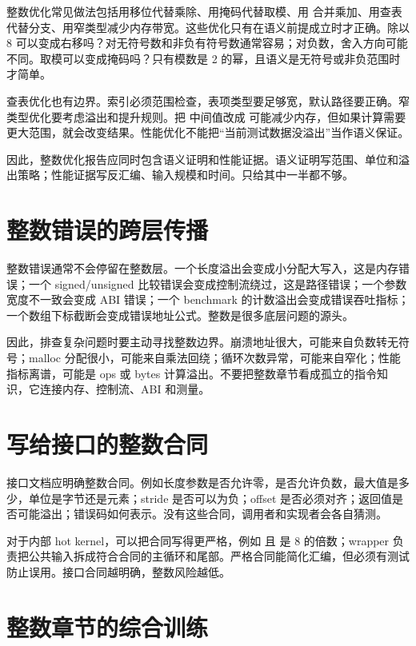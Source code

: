 整数优化常见做法包括用移位代替乘除、用掩码代替取模、用  合并乘加、用查表代替分支、用窄类型减少内存带宽。这些优化只有在语义前提成立时才正确。除以 8 可以变成右移吗？对无符号数和非负有符号数通常容易；对负数，舍入方向可能不同。取模可以变成掩码吗？只有模数是 2 的幂，且语义是无符号或非负范围时才简单。

查表优化也有边界。索引必须范围检查，表项类型要足够宽，默认路径要正确。窄类型优化要考虑溢出和提升规则。把  中间值改成  可能减少内存，但如果计算需要更大范围，就会改变结果。性能优化不能把“当前测试数据没溢出”当作语义保证。

因此，整数优化报告应同时包含语义证明和性能证据。语义证明写范围、单位和溢出策略；性能证据写反汇编、输入规模和时间。只给其中一半都不够。

\section{整数错误的跨层传播}

整数错误通常不会停留在整数层。一个长度溢出会变成小分配大写入，这是内存错误；一个 signed/unsigned 比较错误会变成控制流绕过，这是路径错误；一个参数宽度不一致会变成 ABI 错误；一个 benchmark 的计数溢出会变成错误吞吐指标；一个数组下标截断会变成错误地址公式。整数是很多底层问题的源头。

因此，排查复杂问题时要主动寻找整数边界。崩溃地址很大，可能来自负数转无符号；malloc 分配很小，可能来自乘法回绕；循环次数异常，可能来自窄化；性能指标离谱，可能是 ops 或 bytes 计算溢出。不要把整数章节看成孤立的指令知识，它连接内存、控制流、ABI 和测量。

\section{写给接口的整数合同}

接口文档应明确整数合同。例如长度参数是否允许零，是否允许负数，最大值是多少，单位是字节还是元素；stride 是否可以为负；offset 是否必须对齐；返回值是否可能溢出；错误码如何表示。没有这些合同，调用者和实现者会各自猜测。

对于内部 hot kernel，可以把合同写得更严格，例如  且  是 8 的倍数；wrapper 负责把公共输入拆成符合合同的主循环和尾部。严格合同能简化汇编，但必须有测试防止误用。接口合同越明确，整数风险越低。

\section{整数章节的综合训练}

